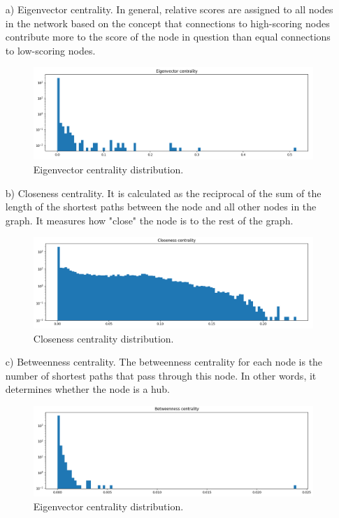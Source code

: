 \documentclass{article}
\begin{document}
\begin{itemize}
\item[a)] Eigenvector centrality. In general, relative scores are assigned to all nodes in the network based on the concept that connections to high-scoring nodes contribute more to the score of the node in question than equal connections to low-scoring nodes.
\begin{figure}[h]
\centering
\includegraphics[width=1\linewidth]{centralities_eigenvector.png}
\caption{Eigenvector centrality distribution.} \label{plot:centrality:eigenvector}
\end{figure}
\item[b)] Closeness centrality. It is calculated as the reciprocal of the sum of the length of the shortest paths between the node and all other nodes in the graph. It measures how "close" the node is to the rest of the graph.
\begin{figure}[h]
\centering
\includegraphics[width=1\linewidth]{centralities_closeness.png}
\caption{Closeness centrality distribution.} \label{plot:centrality:closeness}
\end{figure}
\item[c)] Betweenness centrality. The betweenness centrality for each node is the number of shortest paths that pass through this node. In other words, it determines whether the node is a hub.
\begin{figure}[h]
\centering
\includegraphics[width=1\linewidth]{centralities_betweenness.png}
\caption{Eigenvector centrality distribution.} \label{plot:centrality:betweenness}
\end{figure}
\end{itemize}
\end{document}
